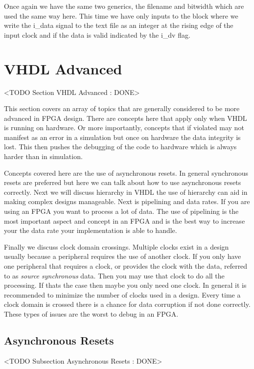 Once again we have the same two generics, the filename and bitwidth which are used the same way here. This time we have only inputs to the block where we write the i\_data signal to the text file as an integer at the rising edge of the input clock and if the data is valid indicated by the i\_dv flag. 
	
\section{VHDL Advanced}
	<TODO Section VHDL Advanced : DONE>

This section covers an array of topics that are generally considered to be more advanced in \ac{FPGA} design. There are concepts here that apply only when \ac{VHDL} is running on hardware. Or more importantly, concepts that if violated may not manifest as an error in a simulation but once on hardware the data integrity is lost. This then pushes the debugging of the code to hardware which is always harder than in simulation. 

Concepts covered here are the use of asynchronous resets. In general synchronous resets are preferred but here we can talk about how to use asynchronous resets correctly. Next we will discuss hierarchy in \ac{VHDL} the use of hierarchy can aid in making complex designs manageable. Next is pipelining and data rates. If you are using an \ac{FPGA} you want to process a lot of data. The use of pipelining is the most important aspect and concept in an \ac{FPGA} and is the best way to increase your the data rate your implementation is able to handle. 

Finally we discuss clock domain crossings. Multiple clocks exist in a design usually because a peripheral requires the use of another clock. If you only have one peripheral that requires a clock, or provides the clock with the data, referred to as \emph{source synchronous} data. Then you may use that clock to do all the processing. If thats the case then maybe you only need one clock. In general it is recommended to minimize the number of clocks used in a design. Every time a clock domain is crossed there is a chance for data corruption if not done correctly. These types of issues are the worst to debug in an \ac{FPGA}. 
	
\subsection{Asynchronous Resets}
	<TODO Subsection Asynchronous Resets : DONE>
	
